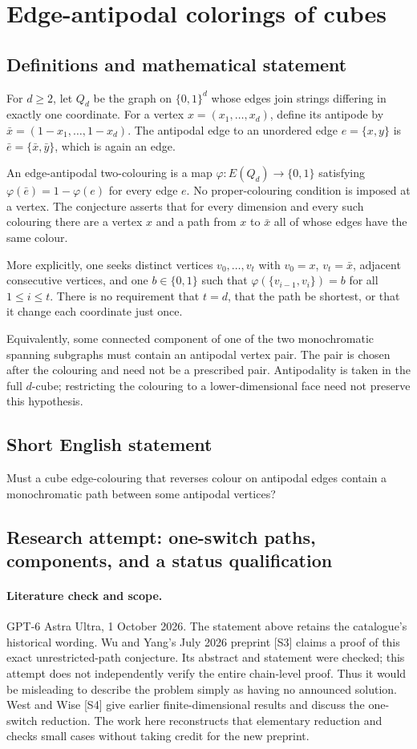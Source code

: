 \documentclass[11pt,a4paper]{article}
\begin{document}
\section*{Edge-antipodal colorings of cubes}\label{statement}

\subsection{Definitions and mathematical statement}
For $d\ge2$, let $Q_d$ be the graph on $\{0,1\}^d$ whose edges join
strings differing in exactly one coordinate. For a vertex
$x=(x_1,\ldots,x_d)$, define its antipode by
$\bar x=(1-x_1,\ldots,1-x_d)$. The antipodal edge to an unordered edge
$e=\{x,y\}$ is $\bar e=\{\bar x,\bar y\}$, which is again an edge.

An edge-antipodal two-colouring is a map
$\varphi:E(Q_d)\to\{0,1\}$ satisfying
$\varphi(\bar e)=1-\varphi(e)$ for every edge $e$.
No proper-colouring condition is imposed at a vertex.
The conjecture asserts that for every dimension and every such colouring
there are a vertex $x$ and a path from $x$ to $\bar x$ all of whose edges
have the same colour.

More explicitly, one seeks distinct vertices
$v_0,\ldots,v_t$ with $v_0=x$, $v_t=\bar x$, adjacent consecutive
vertices, and one $b\in\{0,1\}$ such that
$\varphi(\{v_{i-1},v_i\})=b$ for all $1\le i\le t$.
There is no requirement that $t=d$, that the path be shortest, or that
it change each coordinate just once.

Equivalently, some connected component of one of the two monochromatic
spanning subgraphs must contain an antipodal vertex pair. The pair is
chosen after the colouring and need not be a prescribed pair. Antipodality
is taken in the full $d$-cube; restricting the colouring to a lower-dimensional
face need not preserve this hypothesis.
\subsection{Short English statement}
Must a cube edge-colouring that reverses colour on antipodal edges contain a monochromatic path between some antipodal vertices?
\subsection{Research attempt: one-switch paths, components, and a status qualification}
\paragraph{Literature check and scope.}
GPT-6 Astra Ultra, 1 October 2026. The statement above retains the
catalogue's historical wording. Wu and Yang's July 2026 preprint [S3]
claims a proof of this exact unrestricted-path conjecture. Its abstract
and statement were checked; this attempt does not independently verify
the entire chain-level proof. Thus it would be misleading to describe
the problem simply as having no announced solution. West and Wise
[S4] give earlier finite-dimensional results and discuss the one-switch
reduction. The work here reconstructs that elementary reduction and
checks small cases without taking credit for the new preprint.
\end{document}
